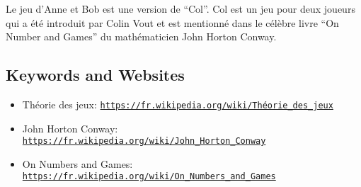 \documentclass[a4paper,11pt]{report}
\newcommand{\BrochureUrlText}[1]{\texttt{#1}}
\begin{document}
Le jeu d’Anne et Bob est une version de “Col”. Col est un jeu pour deux joueurs qui a été introduit par Colin Vout et est mentionné dans le célèbre livre “On Number and Games” du mathématicien John Horton Conway.

{\raggedright

\subsection*{Keywords and Websites}

\begin{itemize}
  \item Théorie des jeux: \href{https://fr.wikipedia.org/wiki/Th\%C3\%A9orie_des_jeux}{\BrochureUrlText{https://fr.wikipedia.org/wiki/Théorie\_des\_jeux}}
  \item John Horton Conway: \href{https://fr.wikipedia.org/wiki/John_Horton_Conway}{\BrochureUrlText{https://fr.wikipedia.org/wiki/John\_Horton\_Conway}}
  \item On Numbers and Games: \href{https://fr.wikipedia.org/wiki/On_Numbers_and_Games}{\BrochureUrlText{https://fr.wikipedia.org/wiki/On\_Numbers\_and\_Games}}
\end{itemize}


}
\end{document}
